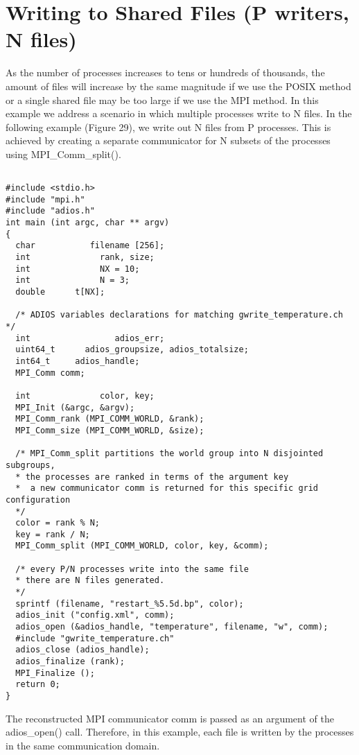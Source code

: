 \section{Writing to Shared Files (P writers, N files)}

As the number of processes increases to tens or hundreds of thousands, the amount 
of files will increase by the same magnitude if we use the POSIX method or a single 
shared file may be too large if we use the MPI method. In this example we address 
a scenario in which multiple processes write to N files. In the following example 
(Figure 29), we write out N files from P processes. This is achieved by creating 
a separate communicator for N subsets of the processes using
MPI\_Comm\_split(). 

\begin{lstlisting}[alsolanguage=C,caption=Example ADIOS program writing N files
  from P processors (N)]

#include <stdio.h>
#include "mpi.h"
#include "adios.h"
int main (int argc, char ** argv) 
{
  char           filename [256];
  int              rank, size;
  int              NX = 10; 
  int              N = 3;
  double      t[NX];
  
  /* ADIOS variables declarations for matching gwrite_temperature.ch */
  int                 adios_err;
  uint64_t      adios_groupsize, adios_totalsize;
  int64_t     adios_handle;
  MPI_Comm comm;

  int              color, key;
  MPI_Init (&argc, &argv);
  MPI_Comm_rank (MPI_COMM_WORLD, &rank);
  MPI_Comm_size (MPI_COMM_WORLD, &size);
  
  /* MPI_Comm_split partitions the world group into N disjointed  subgroups, 
  * the processes are ranked in terms of the argument key  
  *  a new communicator comm is returned for this specific grid configuration
  */
  color = rank % N;
  key = rank / N;
  MPI_Comm_split (MPI_COMM_WORLD, color, key, &comm);
  
  /* every P/N processes write into the same file 
  * there are N files generated. 
  */
  sprintf (filename, "restart_%5.5d.bp", color);
  adios_init ("config.xml", comm);
  adios_open (&adios_handle, "temperature", filename, "w", comm);
  #include "gwrite_temperature.ch"
  adios_close (adios_handle);
  adios_finalize (rank);
  MPI_Finalize ();
  return 0;
}
\end{lstlisting}


The reconstructed MPI communicator comm is passed as an argument of the adios\_open() 
call. Therefore, in this example, each file is written by the processes in the 
same communication domain.

